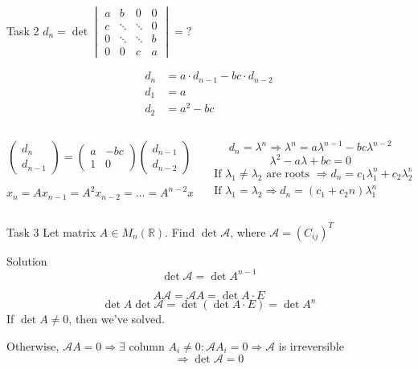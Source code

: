\documentclass[fullscreen=true, bookmarks=true, hyperref={pdfencoding=unicode}]{beamer}
\begin{document}
\begin{frame}{Task 2}
  $d_n = \det \begin{vmatrix}
    a & b & 0 & 0 \\
    c & \ddots & \ddots & 0 \\
    0 & \ddots & \ddots & b \\
    0 & 0 & c & a 
  \end{vmatrix} = ?$  

  \pause
  \begin{align*}
    d_n &= a \cdot d_{n-1} - bc \cdot d_{n-2} \\
    d_1 &= a \\
    d_2 &= a^2-bc
  \end{align*}
  
  \begin{columns}
    \begin{column}{0.5\paperwidth}
      \pause
      $$\begin{pmatrix}
        d_n \\
        d_{n-1}
      \end{pmatrix} = 
      \begin{pmatrix}
        a & -bc \\
        1 & 0
      \end{pmatrix}  
      \begin{pmatrix}
        d_{n-1} \\
        d_{n-2}
      \end{pmatrix}$$
    
      $$ x_n = A x_{n-1} = A^2 x_{n-2} = \hdots = A^{n-2} x_2 $$          
    \end{column}
    \begin{column}{0.5\paperwidth}
      \pause
      $$d_n = \lambda^n \Rightarrow \lambda^n = a \lambda^{n-1} - bc \lambda^{n-2}$$
      $$\lambda^2 - a \lambda + bc = 0 $$
      \begin{align*} 
        \text{If }\lambda_1 \neq \lambda_2 \text{ are roots } \Rightarrow d_n = c_1\lambda_1^n + c_2\lambda_2^n \\
        \text{If }\lambda_1 = \lambda_2 \Rightarrow d_n = (c_1 + c_2n)\lambda_1^n 
      \end{align*} 
    \end{column}
  \end{columns}
\end{frame}


\begin{frame}{Task 3}
  Let matrix $A \in M_n(\mathbb{R})$. Find $\det \mathcal{A}$,
  where $\mathcal{A} = (C_{ij})^T$

  \pause
  \begin{block}{Solution}
    \pause
    $$\det \mathcal{A} = \det A^{n-1}$$
  
    \pause
    $$A\mathcal{A} = \mathcal{A} A = \det A \cdot E $$
    $$\det A \det\mathcal{A} = \det (\det A \cdot E ) = \det A^n$$
    If $\det A \neq 0$, then we've solved. 

    Otherwise, $\mathcal{A} A = 0 \Rightarrow \exists$ column 
    $A_i \neq 0: \mathcal{A} A_i = 0 \Rightarrow \mathcal{A}$ is irreversible
    $$ \Rightarrow \det \mathcal{A} = 0$$
  \end{block}
\end{frame}
\end{document}
